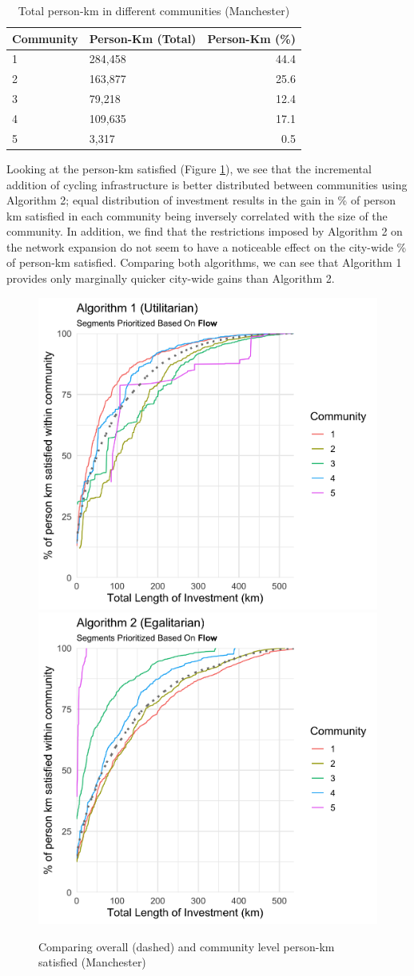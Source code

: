 \documentclass[
]{article}
\begin{document}
\begin{table}[!h]

\caption{\label{tab:personkmtable}Total person-km in different communities (Manchester)}
\centering
\begin{tabular}[t]{l|l|r}
\hline
Community & Person-Km (Total) & Person-Km (\%)\\
\hline
1 & 284,458 & 44.4\\
\hline
2 & 163,877 & 25.6\\
\hline
3 & 79,218 & 12.4\\
\hline
4 & 109,635 & 17.1\\
\hline
5 & 3,317 & 0.5\\
\hline
\end{tabular}
\end{table}

Looking at the person-km satisfied (Figure \ref{fig:growthtotal}), we
see that the incremental addition of cycling infrastructure is better
distributed between communities using Algorithm 2; equal distribution of
investment results in the gain in \% of person km satisfied in each
community being inversely correlated with the size of the community. In
addition, we find that the restrictions imposed by Algorithm 2 on the
network expansion do not seem to have a noticeable effect on the
city-wide \% of person-km satisfied. Comparing both algorithms, we can
see that Algorithm 1 provides only marginally quicker city-wide gains
than Algorithm 2.

\begin{figure}

{\centering \includegraphics[width=0.48\linewidth]{data/Manchester/Plots/Growth_Results/growth_utilitarian_satisfied_km_both_flow_column} \includegraphics[width=0.48\linewidth]{data/Manchester/Plots/Growth_Results/growth_egalitarian_satisfied_km_both_flow_column} 

}

\caption{Comparing overall (dashed) and community level person-km satisfied (Manchester)}\label{fig:growthtotal}
\end{figure}
\end{document}
